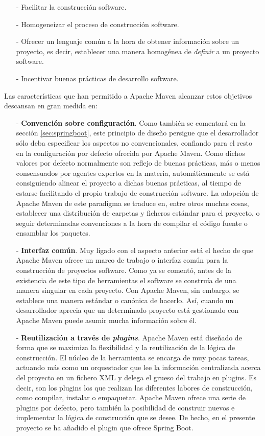 \documentclass[a4paper]{article}
\begin{document}
    \begin{itemize}
    	\item[-] Facilitar la construcción software.
    	\item[-] Homogeneizar el proceso de construcción software.
    	\item[-] Ofrecer un lenguaje común a la hora de obtener información sobre un proyecto, es decir, establecer una manera homogénea de \emph{definir} a un proyecto software.
    	\item[-] Incentivar buenas prácticas de desarrollo software.
    \end{itemize}
    
    Las características que han permitido a Apache Maven alcanzar estos objetivos descansan en gran medida en:
    
    \begin{itemize}
    	\item[-] \textbf{Convención sobre configuración}. Como también se comentará en la sección \ref{sec:springboot}, este principio de diseño persigue que el desarrollador sólo deba especificar los aspectos no convencionales, confiando para el resto en la configuración por defecto ofrecida por Apache Maven. Como dichos valores por defecto normalmente son reflejo de buenas prácticas, más o menos consensuados por agentes expertos en la materia, automáticamente se está consiguiendo alinear el proyecto a dichas buenas prácticas, al tiempo de estarse facilitando el propio trabajo de construcción software. La adopción de Apache Maven de este paradigma se traduce en, entre otros muchas cosas, establecer una distribución de carpetas y ficheros estándar para el proyecto, o seguir determinadas convenciones a la hora de compilar el código fuente o ensamblar los paquetes.
    	\item[-] \textbf{Interfaz común}. Muy ligado con el aspecto anterior está el hecho de que Apache Maven ofrece un marco de trabajo o interfaz común para la construcción de proyectos software. Como ya se comentó, antes de la existencia de este tipo de herramientas el software se construía de una manera singular en cada proyecto. Con Apache Maven, sin embargo, se establece una manera estándar o canónica de hacerlo. Así, cuando un desarrollador aprecia que un determinado proyecto está gestionado con Apache Maven puede asumir mucha información sobre él.
    	\item[-] \textbf{Reutilización a través de \emph{plugins}}. Apache Maven está diseñado de forma que se maximiza la flexibilidad y la reutilización de la lógica de construcción. El núcleo de la herramienta se encarga de muy pocas tareas, actuando más como un orquestador que lee la información centralizada acerca del proyecto en un fichero XML y delega el grueso del trabajo en plugins. Es decir, son los plugins los que realizan las diferentes labores de construcción, como compilar, instalar o empaquetar. Apache Maven ofrece una serie de plugins por defecto, pero también la posibilidad de construir nuevos e implementar la lógica de construcción que se desee. De hecho, en el presente proyecto se ha añadido el plugin que ofrece Spring Boot.

\end{itemize}
\end{document}
